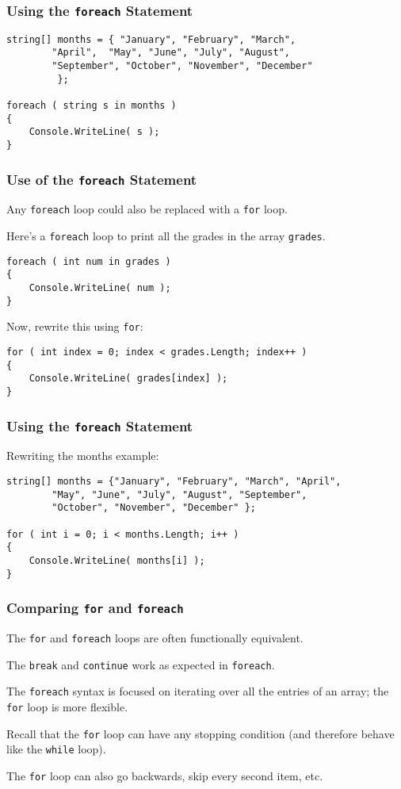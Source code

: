 \begin{frame}[fragile]
\frametitle{Using the \texttt{foreach} Statement}
\begin{verbatim}
string[] months = { "January", "February", "March", 
        "April",  "May", "June", "July", "August",
        "September", "October", "November", "December"
         };

foreach ( string s in months )
{
    Console.WriteLine( s );
}
\end{verbatim}
\end{frame}


\begin{frame}[fragile]
\frametitle{Use of the \texttt{foreach} Statement}

Any \texttt{foreach} loop could also be replaced with a \texttt{for} loop.

Here's a \texttt{foreach} loop to print all the grades in the array \texttt{grades}.


\begin{verbatim}
foreach ( int num in grades )
{
    Console.WriteLine( num );
}
\end{verbatim}

Now, rewrite this using \texttt{for}:

\begin{verbatim}
for ( int index = 0; index < grades.Length; index++ )
{
    Console.WriteLine( grades[index] );
}
\end{verbatim}
\end{frame}

\begin{frame}[fragile]
\frametitle{Using the \texttt{foreach} Statement}
Rewriting the months example:

\begin{verbatim}
string[] months = {"January", "February", "March", "April", 
        "May", "June", "July", "August", "September", 
        "October", "November", "December" };

for ( int i = 0; i < months.Length; i++ )
{
    Console.WriteLine( months[i] );
}
\end{verbatim}
\end{frame}


\begin{frame}
\frametitle{Comparing \texttt{for} and \texttt{foreach}}

The \texttt{for} and \texttt{foreach} loops are often functionally equivalent.

The \texttt{break} and \texttt{continue} work as expected in \texttt{foreach}.

The \texttt{foreach} syntax is focused on iterating over all the entries of an array; the \texttt{for} loop is more flexible.

Recall that the \texttt{for} loop can have any stopping condition (and therefore behave like the \texttt{while} loop).

The \texttt{for} loop can also go backwards, skip every second item, etc.

\end{frame}





